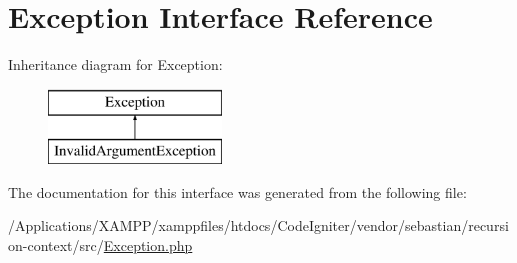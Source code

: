 \hypertarget{interface_sebastian_bergmann_1_1_recursion_context_1_1_exception}{}\section{Exception Interface Reference}
\label{interface_sebastian_bergmann_1_1_recursion_context_1_1_exception}
Inheritance diagram for Exception\+:\begin{figure}[H]
\begin{center}
\leavevmode
\includegraphics[height=2.000000cm]{interface_sebastian_bergmann_1_1_recursion_context_1_1_exception}
\end{center}
\end{figure}


The documentation for this interface was generated from the following file\+:\begin{DoxyCompactItemize}
\item 
/\+Applications/\+X\+A\+M\+P\+P/xamppfiles/htdocs/\+Code\+Igniter/vendor/sebastian/recursion-\/context/src/\mbox{\hyperlink{sebastian_2recursion-context_2src_2_exception_8php}{Exception.\+php}}\end{DoxyCompactItemize}
